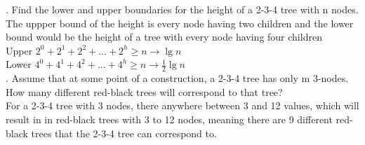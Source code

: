 \documentclass[12pt,largemargins]{homework}
\begin{document}
. Find the lower and upper boundaries for the height of a 2-3-4 tree with n nodes.\\
The uppper bound of the height is every node having two children and the lower bound would be the height of a tree with every node having four children\\
Upper $ 2^0 + 2^1 + 2^2 + ... + 2^h \geq n \rightarrow \lg n$ \\
Lower $ 4^0 + 4^1 + 4^2 + ... + 4^h \geq n \rightarrow \frac{1}{2} \lg n$\\
. Assume that at some point of a construction, a 2-3-4 tree has only m 3-nodes. How many different red-black trees will correspond to that tree?\\
For a 2-3-4 tree with 3 nodes, there anywhere between 3 and 12 values, which will result in in red-black trees with 3 to 12 nodes, meaning there are 9 different red-black trees that the 2-3-4 tree can correspond to.
\end{document}
